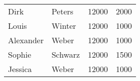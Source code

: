 \begin{enumerate}
\begin{center}
\begin{small}
{            }
            \begin{msoraclesql}
              \begin{supertabular}{llrr}
                Dirk & Peters & 12000 & 2000 \\
                Louis & Winter & 12000 & 1000 \\
                Alexander & Weber & 12000 & 1000 \\
                Sophie & Schwarz & 12000 & 1500 \\
                Jessica & Weber & 12000 & 1000 \\
              \end{supertabular}
            \end{msoraclesql}
          \end{small}
        \end{center}
      \end{enumerate}